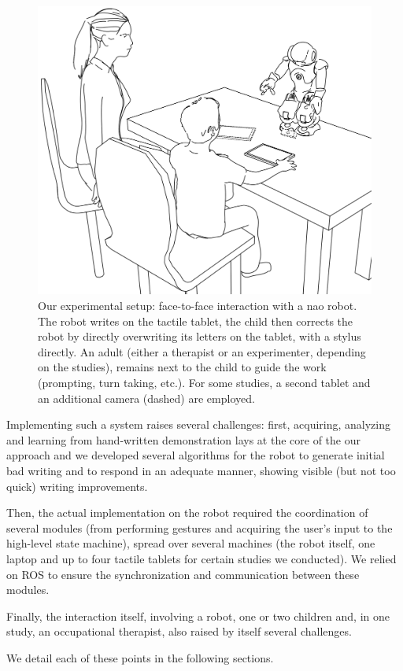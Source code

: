 \documentclass{article}
\begin{document}
\begin{figure}
    \centering
    \includegraphics[width=0.6\columnwidth]{experimental_setup}
    \caption{\small Our experimental setup: face-to-face interaction with a {\sc nao} robot.
        The robot writes on the tactile tablet, the child then corrects the
        robot by directly overwriting its letters on the tablet, with a stylus
        directly. An adult (either a therapist or an experimenter, depending on
        the studies), remains next to the child to guide the work (prompting,
        turn taking, etc.). For some studies, a second tablet and an additional
        camera (dashed) are employed.}

    \label{experimental_setup}
\end{figure}

Implementing such a system raises several challenges: first, acquiring,
analyzing and learning from hand-written demonstration lays at the core of the
our approach and we developed several algorithms for the robot to generate
initial bad writing and to respond in an adequate manner, showing visible (but
not too quick) writing improvements.

Then, the actual implementation on the robot required the coordination of
several modules (from performing gestures and acquiring the user's input to
the high-level state machine), spread over several machines (the robot itself,
one laptop and up to four tactile tablets for certain studies we conducted). We
relied on ROS to ensure the synchronization and communication between these
modules.

Finally, the interaction itself, involving a robot, one or two children and, in
one study, an occupational therapist, also raised by itself several challenges.

We detail each of these points in the following sections.
\end{document}
